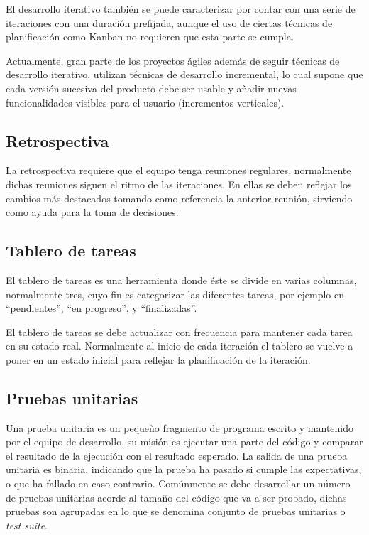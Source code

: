 El desarrollo iterativo también se puede caracterizar por contar con una serie de iteraciones con una duración prefijada, aunque el uso de ciertas técnicas de planificación como Kanban no requieren que esta parte se cumpla.

Actualmente, gran parte de los proyectos ágiles además de seguir técnicas de desarrollo iterativo, utilizan técnicas de desarrollo incremental, lo cual supone que cada versión sucesiva del producto debe ser usable y añadir nuevas funcionalidades visibles para el usuario (incrementos verticales).

\subsection{Retrospectiva}

La retrospectiva requiere que el equipo tenga reuniones regulares, normalmente dichas reuniones siguen el ritmo de las iteraciones. En ellas se deben reflejar los cambios más destacados tomando como referencia la anterior reunión, sirviendo como ayuda para la toma de decisiones.

\subsection{Tablero de tareas}

El tablero de tareas es una herramienta donde éste se divide en varias columnas, normalmente tres, cuyo fin es categorizar las diferentes tareas, por ejemplo en ``pendientes'', ``en progreso'', y ``finalizadas''.

El tablero de tareas se debe actualizar con frecuencia para mantener cada tarea en su estado real. Normalmente al inicio de cada iteración el tablero se vuelve a poner en un estado inicial para reflejar la planificación de la iteración.

\subsection{Pruebas unitarias}

Una prueba unitaria es un pequeño fragmento de programa escrito y mantenido por el equipo de desarrollo, su misión es ejecutar una parte del código y comparar el resultado de la ejecución con el resultado esperado. La salida de una prueba unitaria es binaria, indicando que la prueba ha pasado si cumple las expectativas, o que ha fallado en caso contrario. Comúnmente se debe desarrollar un número de pruebas unitarias acorde al tamaño del código que va a ser probado, dichas pruebas son agrupadas en lo que se denomina conjunto de pruebas unitarias o \textit{test suite}.

